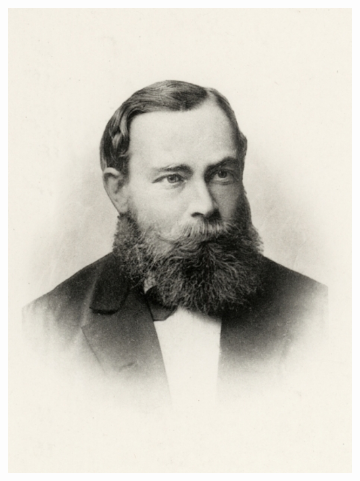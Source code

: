 \documentclass{beamer}
\begin{document}
{\begin{figure}
\begin{subfigure}{0.24\textwidth}
        \includegraphics[width=\linewidth]{images/frege.jpg}
    \end{subfigure}
    \hfill
    \begin{subfigure}{0.24\textwidth}
        \centering

\end{subfigure}
\end{figure}}
\end{document}
